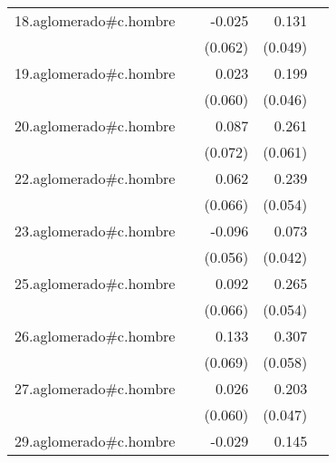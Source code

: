 {\begin{longtable}{l*{4}{D{.}{.}{-1}}}
\addlinespace
18.aglomerado#c.hombre&                     &      -0.025         &       0.131\sym{**} &                     \\
            &                     &     (0.062)         &     (0.049)         &                     \\
\addlinespace
19.aglomerado#c.hombre&                     &       0.023         &       0.199\sym{***}&                     \\
            &                     &     (0.060)         &     (0.046)         &                     \\
\addlinespace
20.aglomerado#c.hombre&                     &       0.087         &       0.261\sym{***}&                     \\
            &                     &     (0.072)         &     (0.061)         &                     \\
\addlinespace
22.aglomerado#c.hombre&                     &       0.062         &       0.239\sym{***}&                     \\
            &                     &     (0.066)         &     (0.054)         &                     \\
\addlinespace
23.aglomerado#c.hombre&                     &      -0.096         &       0.073         &                     \\
            &                     &     (0.056)         &     (0.042)         &                     \\
\addlinespace
25.aglomerado#c.hombre&                     &       0.092         &       0.265\sym{***}&                     \\
            &                     &     (0.066)         &     (0.054)         &                     \\
\addlinespace
26.aglomerado#c.hombre&                     &       0.133         &       0.307\sym{***}&                     \\
            &                     &     (0.069)         &     (0.058)         &                     \\
\addlinespace
27.aglomerado#c.hombre&                     &       0.026         &       0.203\sym{***}&                     \\
            &                     &     (0.060)         &     (0.047)         &                     \\
\addlinespace
29.aglomerado#c.hombre&                     &      -0.029         &       0.145\sym{***}&                     \\

\end{longtable}}
